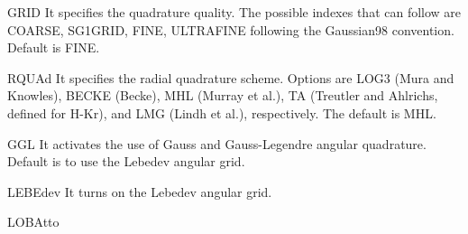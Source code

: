 \begin{keywordlist}
\item[GRID]
It specifies the quadrature quality.
The possible indexes that can follow are
COARSE, SG1GRID, FINE, ULTRAFINE
following the Gaussian98 convention.
Default is FINE.
\item[RQUAd]
It specifies the radial quadrature scheme.
Options are LOG3 (Mura and Knowles)\cite{Mura:96}, BECKE
(Becke)\cite{BeckeG:88}, MHL (Murray et al.)\cite{Murray:93}, TA (Treutler and
Ahlrichs, defined for H-Kr)\cite{Treutler:95}, and LMG (Lindh et
al.)\cite{LMG:01}, respectively. The default is MHL.
\item[GGL ]
It activates the use of Gauss and Gauss-Legendre angular quadrature.
Default is to use the Lebedev angular grid.
\item[LEBEdev]
It turns on the Lebedev angular grid.
\item[LOBAtto]

\end{keywordlist}
